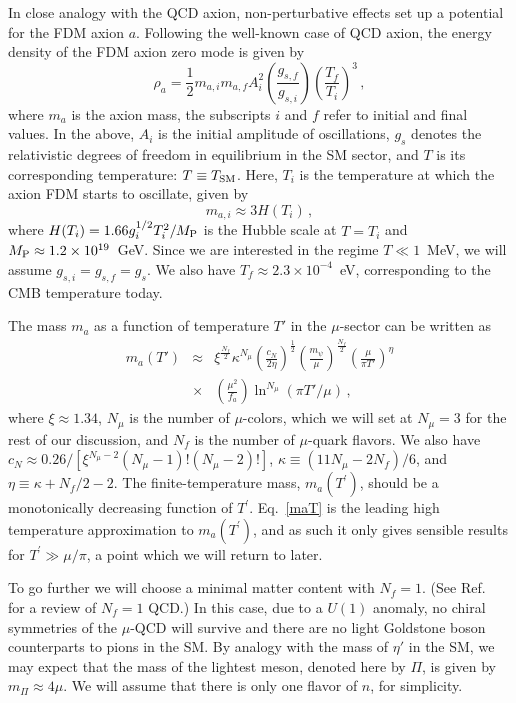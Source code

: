 \documentclass[twocolumn,preprintnumbers,
endnote,prl]{revtex4-1}
\newcommand{\beq}{\begin{equation}}
\newcommand{\eeq}{\end{equation}}
\newcommand{\bea}{\begin{eqnarray}}
\newcommand{\eea}{\end{eqnarray}}
\newcommand{\mP}{M_{\rm P}}
\newcommand{\tsm}{T_{\rm SM}}
\begin{document}
In close analogy with the QCD axion, non-perturbative effects set up a potential for the FDM axion $a$.  
Following the well-known case of QCD axion, the energy density of the FDM axion zero mode 
is given by~\cite{Preskill:1982cy, Abbott:1982af, Dine:1982ah} 
\beq
\rho_a = \frac{1}{2} m_{a, i} m_{a, f} A_i^2  \left(\frac{g_{s, f}}{g_{s, i}}\right) \left(\frac{T_f}{T_i}\right)^3\,,
\label{rhoa}
\eeq 
where $m_a$ is the axion mass, the subscripts $i$ and $f$ refer to initial and final values.  In the above, $A_i$ is the 
initial amplitude of oscillations, $g_s$ denotes the relativistic 
degrees of freedom in equilibrium in the SM sector, and $T$ is its corresponding temperature: $T\equiv 
\tsm$.  Here, $T_i$ is the temperature at which the axion FDM starts to oscillate, given by 
\beq
m_{a, i} \approx 3 H (T_i)\,,
\label{mai}
\eeq
where $H(T_i) = 1.66 g_i^{1/2} T_i^2/\mP$ is the Hubble scale at $T=T_i$ and $\mP\approx 1.2 \times 10^{19}$~GeV. Since we are interested in the regime $T\ll 1$~MeV, we will assume $g_{s,i}=g_{s,f}=g_s$.  
We also have $T_f \approx 2.3 \times 10^{-4}$~eV, corresponding to the CMB temperature today.

  
The mass $m_a$ as a function of temperature $T'$ in the $\mu$-sector can be written as~\cite{Gross:1980br, Davoudiasl:2006bt} 
\bea\label{maT}
m_a(T') &\approx& \xi^{\frac{N_f}{2}} \kappa^{N_{\mu}} \left(\frac{c_N}{2 \eta}\right)^{\frac{1}{2}} 
\left(\frac{m_\psi}{\mu}\right)^{\frac{N_f}{2}} \left(\frac{\mu}{\pi T'}\right)^{\eta}\\ \nonumber
&\times&\left(\frac{\mu^2}{f_a}\right)
\ln^{N_{\mu}}(\pi T'/\mu)\,,
\eea
where $\xi \approx1.34$, $N_{\mu}$ is the number of $\mu$-colors, which we will set at $N_{\mu}=3$ 
for the rest of our discussion, and $N_f$ is the number of $\mu$-quark flavors.  We also have 
$c_N\approx 0.26/[\xi^{N_{\mu}-2}(N_{\mu}-1)!(N_{\mu}-2)!]$, $\kappa \equiv (11N_{\mu}-2 N_f)/6$, and 
$\eta \equiv \kappa + N_f/2 -2$. The finite-temperature mass, $m_a(T^{\prime})$, should be a monotonically decreasing function of $T^{\prime}$. Eq.~\eqref{maT} is the leading high temperature approximation to $m_a(T^{\prime})$, and as such it only gives sensible results for $T^{\prime} \gg \mu / \pi$, a point which we will return to later.

To go further we will choose a minimal matter content with $N_f=1$.  (See Ref.~\cite{Creutz:2006ts} for a review of $N_f=1$ QCD.) In this case, due to a $U(1)$ anomaly, 
no chiral symmetries of the $\mu$-QCD will survive and there are no light Goldstone boson counterparts to pions in the SM. 
By analogy with the mass of $\eta'$ in the SM, we may expect that the mass 
of the lightest meson, denoted here by $\Pi$, is given by $m_{\Pi} \approx 4 \mu$.  We will assume that there is 
only one flavor of $n$, for simplicity.  
\end{document}
